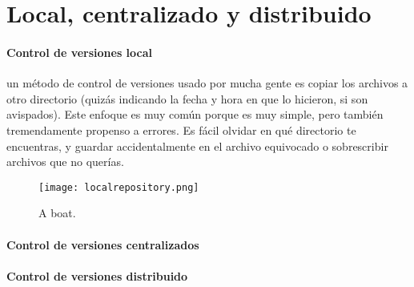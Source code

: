 \documentclass[12pt]{article}
\begin{document}
	\section{Local, centralizado y distribuido}
	{
		\paragraph{Control de versiones local}{
			un método de control de versiones usado por mucha gente es copiar los archivos a otro directorio (quizás indicando la fecha y hora en que lo hicieron, si son avispados). Este enfoque es muy común porque es muy simple, pero también tremendamente propenso a errores. Es fácil olvidar en qué directorio te encuentras, y guardar accidentalmente en el archivo equivocado o sobrescribir archivos que no querías.
			\begin{figure}
				\texttt{[image: localrepository.png]}
				\caption{A boat.}
				\label{fig:boat1}
			\end{figure}
		}
		\paragraph{Control de versiones centralizados}{
		}
		\paragraph{Control de versiones distribuido}{
		}
	}
\end{document}

